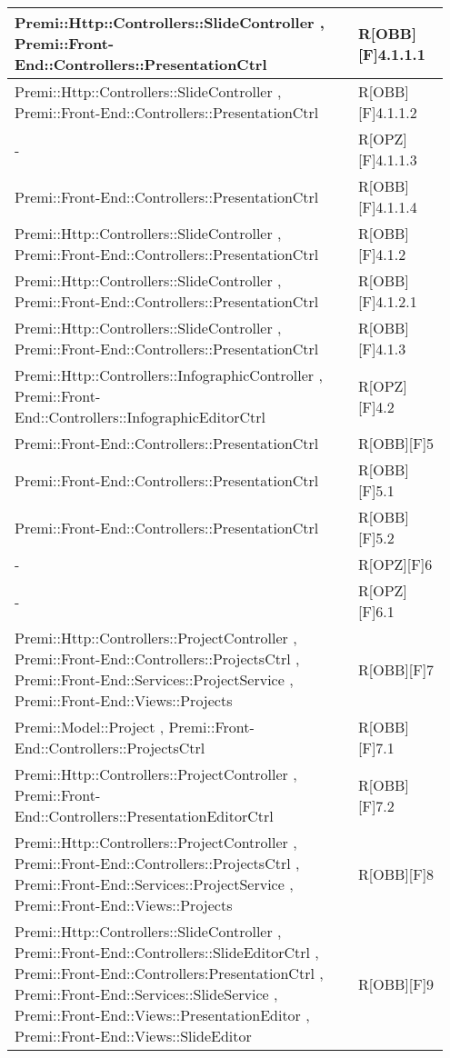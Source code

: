 \begin{table}[h]
	\begin{center}
		\begin{tabular}{|p{0.75\linewidth}|p{0.2\linewidth}|}
			\toprule
			Premi::Http::Controllers::SlideController , Premi::Front-End::Controllers::PresentationCtrl & R[OBB][F]4.1.1.1 \\
		\midrule
			Premi::Http::Controllers::SlideController , Premi::Front-End::Controllers::PresentationCtrl & R[OBB][F]4.1.1.2 \\
		\midrule
			- & R[OPZ][F]4.1.1.3 \\
		\midrule
			Premi::Front-End::Controllers::PresentationCtrl & R[OBB][F]4.1.1.4 \\
		\midrule
			Premi::Http::Controllers::SlideController , Premi::Front-End::Controllers::PresentationCtrl & R[OBB][F]4.1.2 \\
		\midrule
			Premi::Http::Controllers::SlideController , Premi::Front-End::Controllers::PresentationCtrl & R[OBB][F]4.1.2.1 \\
		\midrule
			Premi::Http::Controllers::SlideController , Premi::Front-End::Controllers::PresentationCtrl & R[OBB][F]4.1.3 \\
		\midrule
			Premi::Http::Controllers::InfographicController , Premi::Front-End::Controllers::InfographicEditorCtrl & R[OPZ][F]4.2 \\
		\midrule
			Premi::Front-End::Controllers::PresentationCtrl & R[OBB][F]5  \\
		\midrule
			Premi::Front-End::Controllers::PresentationCtrl & R[OBB][F]5.1 \\
		\midrule
			Premi::Front-End::Controllers::PresentationCtrl & R[OBB][F]5.2 \\
		\midrule
			 - & R[OPZ][F]6 \\
		\midrule
			- & R[OPZ][F]6.1 \\
		\midrule
			Premi::Http::Controllers::ProjectController , Premi::Front-End::Controllers::ProjectsCtrl , Premi::Front-End::Services::ProjectService , Premi::Front-End::Views::Projects & R[OBB][F]7 \\
		\midrule
			Premi::Model::Project , Premi::Front-End::Controllers::ProjectsCtrl & R[OBB][F]7.1 \\
		\midrule
			Premi::Http::Controllers::ProjectController , Premi::Front-End::Controllers::PresentationEditorCtrl & R[OBB][F]7.2 \\
		\midrule
			Premi::Http::Controllers::ProjectController , Premi::Front-End::Controllers::ProjectsCtrl , Premi::Front-End::Services::ProjectService , Premi::Front-End::Views::Projects & R[OBB][F]8 \\
		\midrule
			Premi::Http::Controllers::SlideController , Premi::Front-End::Controllers::SlideEditorCtrl , Premi::Front-End::Controllers:PresentationCtrl , Premi::Front-End::Services::SlideService  , Premi::Front-End::Views::PresentationEditor , Premi::Front-End::Views::SlideEditor & R[OBB][F]9 \\
		\bottomrule
		\end{tabular}
	\end{center}
\end{table}
	

